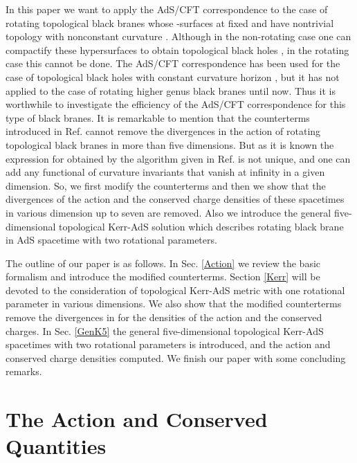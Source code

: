 \documentclass[a4paper,12pt,onecolumn]{revtex4}
\begin{document}
In this paper we want to apply the AdS/CFT correspondence to the
case of rotating topological black branes whose \coordHE{}-surfaces
at fixed \coordHE{} and \coordHE{} have nontrivial topology with nonconstant
curvature \cite{Kl97,Kl98}. Although in the non-rotating case one
can compactify these hypersurfaces to obtain topological black
holes \cite{TBH1,TBH2}, in the rotating case this cannot be done.
The AdS/CFT correspondence has been used for the case of
topological black holes with constant curvature horizon
\cite{Emp,Cai,Ghez}, but it has not applied to the case of
rotating higher genus black branes until now. Thus it is
worthwhile to investigate the efficiency of the AdS/CFT
correspondence for this type of black branes. It is remarkable to
mention that the counterterms introduced in Ref. \cite{Kls} cannot
remove the \coordHE{} divergences in the action of rotating topological
black branes in more than five dimensions. But as it is known the
expression for \coordHE{} obtained by the algorithm given in Ref.
\cite{Kls} is not unique, and one can add any functional of
curvature invariants that vanish at infinity in a given dimension.
So, we first modify the counterterms and then we show that the \coordHE{}
divergences of the action and the conserved charge densities of
these spacetimes in various dimension up to seven are removed.
Also we introduce the general five-dimensional topological
Kerr-AdS solution which describes rotating black brane in AdS
spacetime with two rotational parameters.

The outline of our paper is as follows. In Sec. \ref{Action} we review the
basic formalism and introduce the modified counterterms. Section \ref{Kerr}
will be devoted to the consideration of topological Kerr-AdS metric with one
rotational parameter in various dimensions. We also show that the modified
counterterms remove the divergences in \coordHE{} for the densities of the action
and the conserved charges. In Sec. \ref{GenK5} the general five-dimensional
topological Kerr-AdS spacetimes with two rotational parameters is
introduced, and the action and conserved charge densities computed. We
finish our paper with some concluding remarks.

\section{The Action and Conserved Quantities\label{Action}}
\end{document}
